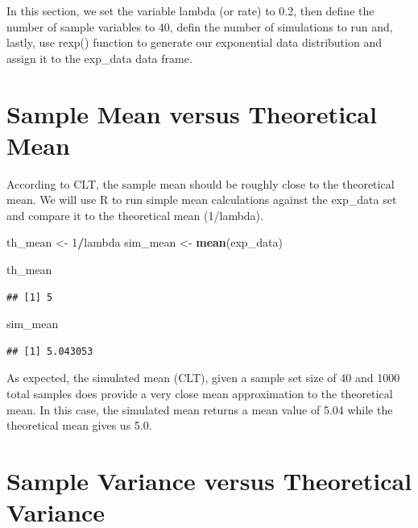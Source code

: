 \documentclass[]{article}
\newenvironment{Shaded}{\begin{snugshade}}{\end{snugshade}}
\newcommand{\DecValTok}[1]{\textcolor[rgb]{0.00,0.00,0.81}{#1}}
\newcommand{\KeywordTok}[1]{\textcolor[rgb]{0.13,0.29,0.53}{\textbf{#1}}}
\newcommand{\NormalTok}[1]{#1}
\newcommand{\OperatorTok}[1]{\textcolor[rgb]{0.81,0.36,0.00}{\textbf{#1}}}
\newcommand{\StringTok}[1]{\textcolor[rgb]{0.31,0.60,0.02}{#1}}
\begin{document}
In this section, we set the variable lambda (or rate) to 0.2, then
define the number of sample variables to 40, defin the number of
simulations to run and, lastly, use rexp() function to generate our
exponential data distribution and assign it to the exp\_data data frame.

\hypertarget{sample-mean-versus-theoretical-mean}{%
\section{Sample Mean versus Theoretical
Mean}\label{sample-mean-versus-theoretical-mean}}

According to CLT, the sample mean should be roughly close to the
theoretical mean. We will use R to run simple mean calculations against
the exp\_data set and compare it to the theoretical mean (1/lambda).

\begin{Shaded}
\begin{Highlighting}[]
\NormalTok{th_mean    <-}\StringTok{ }\DecValTok{1}\OperatorTok{/}\NormalTok{lambda}
\NormalTok{sim_mean   <-}\StringTok{ }\KeywordTok{mean}\NormalTok{(exp_data)}

\NormalTok{th_mean}
\end{Highlighting}
\end{Shaded}

\begin{verbatim}
## [1] 5
\end{verbatim}

\begin{Shaded}
\begin{Highlighting}[]
\NormalTok{sim_mean}
\end{Highlighting}
\end{Shaded}

\begin{verbatim}
## [1] 5.043053
\end{verbatim}

As expected, the simulated mean (CLT), given a sample set size of 40 and
1000 total samples does provide a very close mean approximation to the
theoretical mean. In this case, the simulated mean returns a mean value
of 5.04 while the theoretical mean gives us 5.0.

\hypertarget{sample-variance-versus-theoretical-variance}{%
\section{Sample Variance versus Theoretical
Variance}\label{sample-variance-versus-theoretical-variance}}
\end{document}

